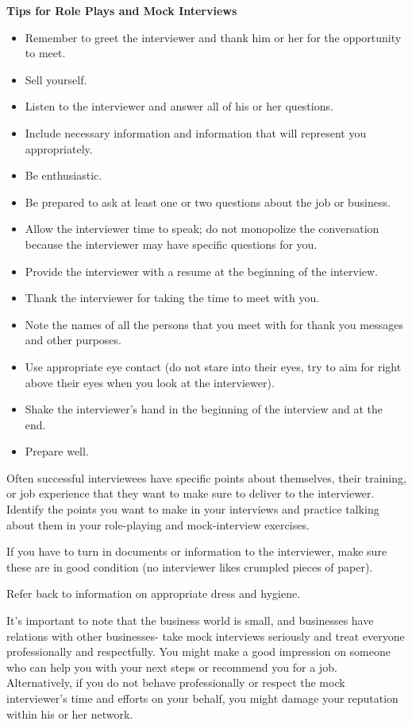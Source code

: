 \textbf{Tips for Role Plays and Mock Interviews}
\begin{itemize}[leftmargin=*]
\item Remember to greet the interviewer and thank him or her for the opportunity to meet.
\item Sell yourself.
\item Listen to the interviewer and answer all of his or her questions.
\item Include necessary information and information that will represent you appropriately.
\item Be enthusiastic.
\item Be prepared to ask at least one or two questions about the job or business.
\item Allow the interviewer time to speak; do not monopolize the conversation because the interviewer may have specific questions for you.
\item Provide the interviewer with a resume at the beginning of the interview.
\item Thank the interviewer for taking the time to meet with you.
\item Note the names of all the persons that you meet with for thank you messages and other purposes.
\item Use appropriate eye contact (do not stare into their eyes, try to aim for right above their eyes when you look at the interviewer).
\item Shake the interviewer's hand in the beginning of the interview and at the end.
\item Prepare well.
\end{itemize}
Often successful interviewees have specific points about themselves, their training, or job experience that they want to make sure to deliver to the interviewer. Identify the points you want to make in your interviews and practice talking about them in your role-playing and mock-interview exercises.

If you have to turn in documents or information to the interviewer, make sure these are in good condition (no interviewer likes crumpled pieces of paper).

Refer back to information on appropriate dress and hygiene.

It's important to note that the business world is small, and businesses have relations with other businesses- take mock interviews seriously and treat everyone professionally and respectfully. You might make a good impression on someone who can help you with your next steps or recommend you for a job. Alternatively, if you do not behave professionally or respect the mock interviewer's time and efforts on your behalf, you might damage your reputation within his or her network.

